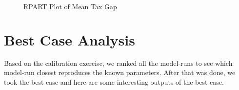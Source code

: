 \documentclass{article}
\begin{document}
  \begin{figure}[ht]
		\caption{RPART Plot of Mean Tax Gap}
	\end{figure}
	
\section{Best Case Analysis}
Based on the calibration exercise, we ranked all the model-runs to see which model-run closest reproduces the known parameters. After that was done, we took the best case and here are some interesting outputs of the best case.
\end{document}
